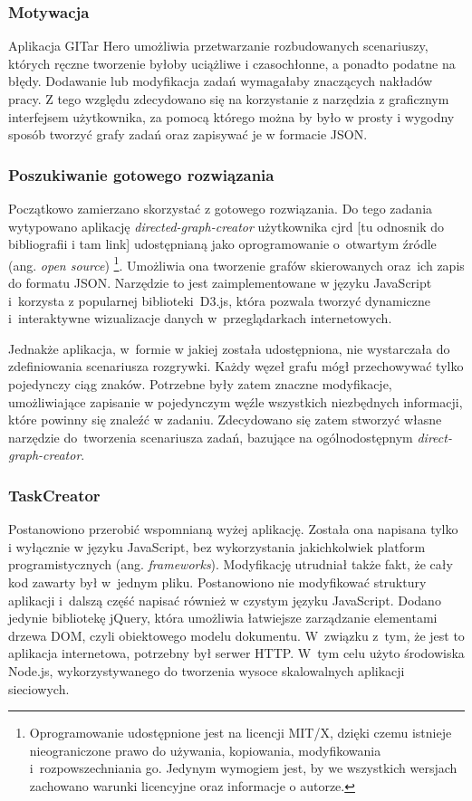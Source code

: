 \documentclass[12pt,a4paper,polish,thesis]{dcsbook}
\begin{document}
{	\subsubsection{Motywacja}

	Aplikacja GITar Hero umożliwia przetwarzanie rozbudowanych scenariuszy, których ręczne tworzenie byłoby uciążliwe i  czasochłonne, a ponadto podatne na błędy. Dodawanie lub modyfikacja zadań wymagałaby znaczących nakładów pracy.
	Z tego względu zdecydowano się na korzystanie z narzędzia z graficznym interfejsem użytkownika, za pomocą którego można by było w prosty i wygodny sposób tworzyć grafy zadań oraz zapisywać je w formacie JSON.

	\subsubsection{Poszukiwanie gotowego rozwiązania}

	Początkowo zamierzano skorzystać z gotowego rozwiązania. Do tego zadania wytypowano aplikację \textit{directed-graph-creator} użytkownika cjrd [tu odnosnik do bibliografii i tam link] udostępnianą jako oprogramowanie o~otwartym źródle (ang. \textit{open source}) \footnote{Oprogramowanie udostępnione jest na licencji MIT/X, dzięki czemu istnieje nieograniczone prawo do używania, kopiowania, modyfikowania i~rozpowszechniania go. Jedynym wymogiem jest, by we wszystkich wersjach zachowano warunki licencyjne oraz informacje o autorze.}. Umożliwia ona tworzenie grafów skierowanych oraz~ich zapis do formatu JSON. Narzędzie to jest zaimplementowane w języku JavaScript i~korzysta z popularnej biblioteki~D3.js, która pozwala tworzyć dynamiczne i~interaktywne wizualizacje danych w~przeglądarkach internetowych.

	Jednakże aplikacja, w~formie w jakiej została udostępniona, nie wystarczała do zdefiniowania scenariusza rozgrywki. Każdy węzeł grafu mógł przechowywać tylko pojedynczy ciąg znaków. Potrzebne były zatem znaczne modyfikacje, umożliwiające zapisanie w pojedynczym węźle wszystkich niezbędnych informacji, które powinny się znaleźć w zadaniu. Zdecydowano się zatem stworzyć własne narzędzie do~tworzenia scenariusza zadań, bazujące na ogólnodostępnym \textit{direct-graph-creator}.

	\subsubsection{TaskCreator}

	Postanowiono przerobić wspomnianą wyżej aplikację. Została ona napisana tylko i wyłącznie w języku JavaScript, bez wykorzystania jakichkolwiek platform programistycznych (ang. \textit{frameworks}). Modyfikację utrudniał także fakt, że cały kod zawarty był w~jednym pliku. Postanowiono nie modyfikować struktury aplikacji i~dalszą część napisać również w czystym języku JavaScript. Dodano jedynie bibliotekę jQuery, która umożliwia łatwiejsze zarządzanie elementami drzewa DOM, czyli obiektowego modelu dokumentu. W~związku z~tym, że jest to aplikacja internetowa, potrzebny był serwer HTTP. W~tym celu użyto środowiska Node.js, wykorzystywanego do tworzenia wysoce skalowalnych aplikacji sieciowych.

}
\end{document}
